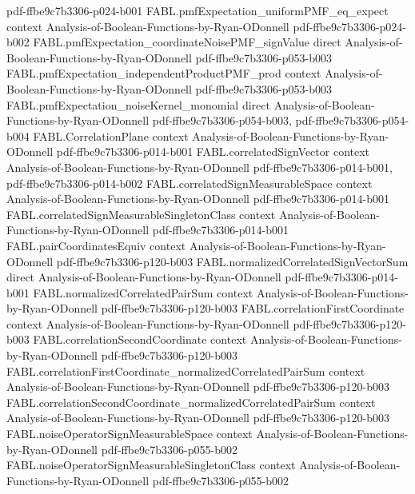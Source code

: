 \begin{theorem}
  {pdf-ffbe9c7b3306-p024-b001}
\proofstep
  {FABL.pmfExpectation_uniformPMF_eq_expect}
  {context}
  {Analysis-of-Boolean-Functions-by-Ryan-ODonnell}
  {pdf-ffbe9c7b3306-p024-b002}
\proofstep
  {FABL.pmfExpectation_coordinateNoisePMF_signValue}
  {direct}
  {Analysis-of-Boolean-Functions-by-Ryan-ODonnell}
  {pdf-ffbe9c7b3306-p053-b003}
\proofstep
  {FABL.pmfExpectation_independentProductPMF_prod}
  {context}
  {Analysis-of-Boolean-Functions-by-Ryan-ODonnell}
  {pdf-ffbe9c7b3306-p053-b003}
\proofstep
  {FABL.pmfExpectation_noiseKernel_monomial}
  {direct}
  {Analysis-of-Boolean-Functions-by-Ryan-ODonnell}
  {pdf-ffbe9c7b3306-p054-b003,
    pdf-ffbe9c7b3306-p054-b004}
\proofstep
  {FABL.CorrelationPlane}
  {context}
  {Analysis-of-Boolean-Functions-by-Ryan-ODonnell}
  {pdf-ffbe9c7b3306-p014-b001}
\proofstep
  {FABL.correlatedSignVector}
  {context}
  {Analysis-of-Boolean-Functions-by-Ryan-ODonnell}
  {pdf-ffbe9c7b3306-p014-b001,
    pdf-ffbe9c7b3306-p014-b002}
\proofstep
  {FABL.correlatedSignMeasurableSpace}
  {context}
  {Analysis-of-Boolean-Functions-by-Ryan-ODonnell}
  {pdf-ffbe9c7b3306-p014-b001}
\proofstep
  {FABL.correlatedSignMeasurableSingletonClass}
  {context}
  {Analysis-of-Boolean-Functions-by-Ryan-ODonnell}
  {pdf-ffbe9c7b3306-p014-b001}
\proofstep
  {FABL.pairCoordinatesEquiv}
  {context}
  {Analysis-of-Boolean-Functions-by-Ryan-ODonnell}
  {pdf-ffbe9c7b3306-p120-b003}
\proofstep
  {FABL.normalizedCorrelatedSignVectorSum}
  {direct}
  {Analysis-of-Boolean-Functions-by-Ryan-ODonnell}
  {pdf-ffbe9c7b3306-p014-b001}
\proofstep
  {FABL.normalizedCorrelatedPairSum}
  {context}
  {Analysis-of-Boolean-Functions-by-Ryan-ODonnell}
  {pdf-ffbe9c7b3306-p120-b003}
\proofstep
  {FABL.correlationFirstCoordinate}
  {context}
  {Analysis-of-Boolean-Functions-by-Ryan-ODonnell}
  {pdf-ffbe9c7b3306-p120-b003}
\proofstep
  {FABL.correlationSecondCoordinate}
  {context}
  {Analysis-of-Boolean-Functions-by-Ryan-ODonnell}
  {pdf-ffbe9c7b3306-p120-b003}
\proofstep
  {FABL.correlationFirstCoordinate_normalizedCorrelatedPairSum}
  {context}
  {Analysis-of-Boolean-Functions-by-Ryan-ODonnell}
  {pdf-ffbe9c7b3306-p120-b003}
\proofstep
  {FABL.correlationSecondCoordinate_normalizedCorrelatedPairSum}
  {context}
  {Analysis-of-Boolean-Functions-by-Ryan-ODonnell}
  {pdf-ffbe9c7b3306-p120-b003}
\proofstep
  {FABL.noiseOperatorSignMeasurableSpace}
  {context}
  {Analysis-of-Boolean-Functions-by-Ryan-ODonnell}
  {pdf-ffbe9c7b3306-p055-b002}
\proofstep
  {FABL.noiseOperatorSignMeasurableSingletonClass}
  {context}
  {Analysis-of-Boolean-Functions-by-Ryan-ODonnell}
  {pdf-ffbe9c7b3306-p055-b002}

\end{theorem}
